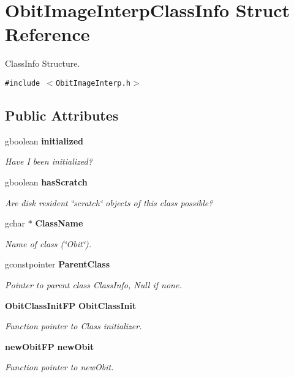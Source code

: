 \section{Obit\-Image\-Interp\-Class\-Info Struct Reference}
\label{structObitImageInterpClassInfo}
Class\-Info Structure.  


{\tt \#include $<$Obit\-Image\-Interp.h$>$}

\subsection*{Public Attributes}
\begin{CompactItemize}
\item 
gboolean {\bf initialized}
\begin{CompactList}\small\item\em Have I been initialized? \item\end{CompactList}\item 
gboolean {\bf has\-Scratch}
\begin{CompactList}\small\item\em Are disk resident \char`\"{}scratch\char`\"{} objects of this class possible? \item\end{CompactList}\item 
gchar $\ast$ {\bf Class\-Name}
\begin{CompactList}\small\item\em Name of class (\char`\"{}Obit\char`\"{}). \item\end{CompactList}\item 
gconstpointer {\bf Parent\-Class}
\begin{CompactList}\small\item\em Pointer to parent class Class\-Info, Null if none. \item\end{CompactList}\item 
{\bf Obit\-Class\-Init\-FP} {\bf Obit\-Class\-Init}
\begin{CompactList}\small\item\em Function pointer to Class initializer. \item\end{CompactList}\item 
{\bf new\-Obit\-FP} {\bf new\-Obit}
\begin{CompactList}\small\item\em Function pointer to new\-Obit. \item\end{CompactList}\item 

\end{CompactItemize}
